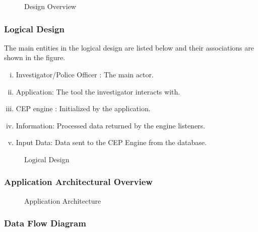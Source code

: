 \begin{center}
\begin{figure}[h]
\caption{Design Overview}

\end{figure}
\end{center}

\subsubsection{Logical Design}

\noindent The main entities in the logical design  are listed below and their associations are shown in the figure.

\begin{enumerate}[(i)]
\item Investigator/Police Officer : The main actor.
\item Application: The tool  the investigator interacts with.
\item CEP engine : Initialized by the application.
\item Information: Processed data returned by the engine listeners.
\item Input Data: Data sent to the CEP Engine from the database.
 

 \end{enumerate}

\begin{center}
\begin{figure}[h]
\caption{Logical Design}

\end{figure}
\end{center}
\newpage
\subsubsection{Application Architectural Overview}


\begin{center}
\begin{figure}[h]
\caption{Application Architecture}

\end{figure}
\end{center}

\subsubsection{Data Flow Diagram}

